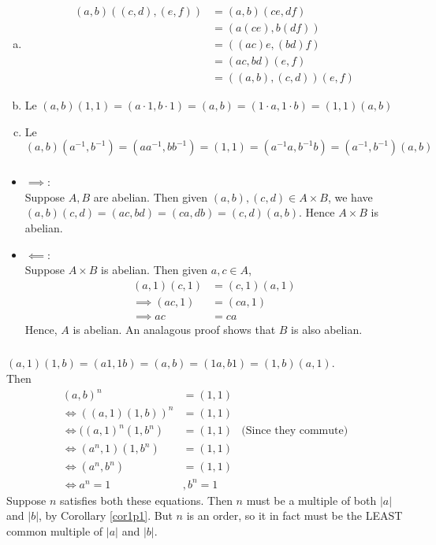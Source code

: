 \documentclass{article}
\newcommand{\inv}[1]{ {#1}^{-1} }
\begin{document}
\subsubsection{}
\begin{enumerate}[(a)]
\item 
\begin{align*}
(a,b)( (c,d), (e,f) ) &= (a,b)(ce,df)\\
&= (a(ce), b(df))\\
&= ((ac)e, (bd)f)\\
&= (ac,bd)(e,f)\\
&= ((a,b),(c,d))(e,f)
\end{align*}
\item Le $(a,b)(1,1) = (a\cdot 1, b\cdot 1) = (a,b) = (1\cdot a, 1\cdot b) = (1,1)(a,b)$
\item  Le $(a,b)(\inv{a}, \inv{b}) = (a\inv{a}, b\inv{b}) = (1,1) = (\inv{a}a,\inv{b}b) = (\inv{a},\inv{b})(a,b)$
\end{enumerate}
\subsubsection{}
\begin{itemize} 
\item $\implies$:
\\
Suppose $A,B$ are abelian. Then given $(a,b),(c,d) \in A \times B$, we have $(a,b)(c,d) = (ac,bd) = (ca,db) = (c,d)(a,b)$. Hence $A \times B$ is abelian.
\item $\impliedby$:
\\
Suppose $A \times B$ is abelian. Then given $a,c \in A$,
\begin{align*}
(a,1)(c,1) &= (c,1)(a,1)\\
\implies (ac, 1) &= (ca, 1)\\
\implies ac &= ca
\end{align*}
Hence, $A$ is abelian. An analagous proof shows that $B$ is also abelian.
\end{itemize}
\subsubsection{}
$(a,1)(1,b) = (a1,1b) = (a,b) = (1a,b1) = (1,b)(a,1)$.\\
Then
\begin{align*}
(a,b)^n &= (1,1)\\
\iff ((a,1)(1,b))^n &= (1,1)\\
\iff ((a,1)^n(1,b^n) &= (1,1) & \mbox{(Since they commute)}\\
\iff (a^n,1)(1,b^n) &= (1,1)\\
\iff (a^n, b^n) &= (1,1)\\
\iff a^n = 1 &, b^n =1
\end{align*}
Suppose $n$ satisfies both these equations. Then $n$ must be a multiple of both $|a|$ and $|b|$, by Corollary \ref{cor1p1}. But $n$ is an order, so it in fact must be the LEAST common multiple of $|a|$ and $|b|$.
\end{document}
